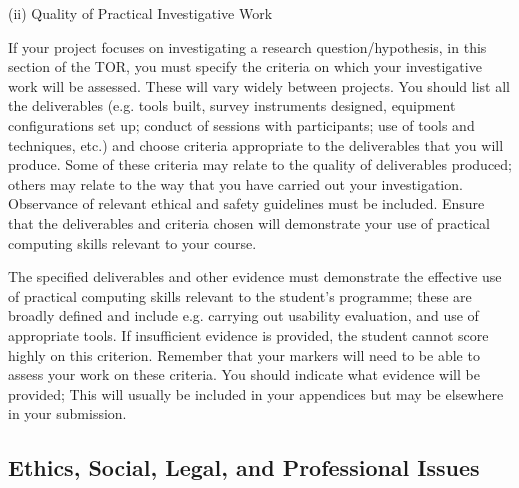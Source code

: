 \documentclass[../CHEFCookingHelperForEveryonesFridge.tex]{subfiles}
\begin{document}
{    (ii)	Quality of Practical Investigative Work

    If your project focuses on investigating a research question/hypothesis, in this section of the TOR, you must specify the criteria
    on which your investigative work will be assessed. These will vary widely between projects. You should list all the deliverables
    (e.g. tools built, survey instruments designed, equipment configurations set up; conduct of sessions with participants; use of tools and techniques, etc.)
    and choose criteria appropriate to the deliverables that you will produce. Some of these criteria may relate to the quality of deliverables produced;
    others may relate to the way that you have carried out your investigation. Observance of relevant ethical and safety guidelines must be included.
    Ensure that the deliverables and criteria chosen will demonstrate your use of practical computing skills relevant to your course.

    The specified deliverables and other evidence must demonstrate the effective use of practical computing skills relevant to the student’s programme;
    these are broadly defined and include e.g. carrying out usability evaluation, and use of appropriate tools. If insufficient evidence is provided,
    the student cannot score highly on this criterion.
    Remember that your markers will need to be able to assess your work on these criteria. You should indicate what evidence will be provided;
    This will usually be included in your appendices but may be elsewhere in your submission.
}

\subsection{Ethics, Social, Legal, and Professional Issues}

\end{document}
